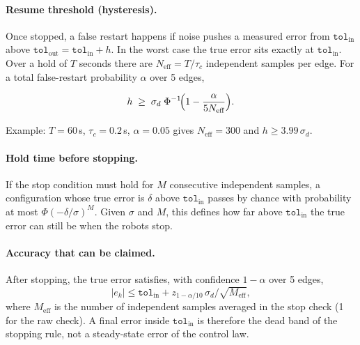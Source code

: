 \documentclass[11pt,a4paper]{article}
\begin{document}
\paragraph{Resume threshold (hysteresis).}
Once stopped, a false restart happens if noise pushes a measured error from
$\texttt{tol}_\text{in}$ above $\texttt{tol}_\text{out}=\texttt{tol}_\text{in}+h$.
In the worst case the true error sits exactly at $\texttt{tol}_\text{in}$.
Over a hold of $T$ seconds there are $N_\text{eff}=T/\tau_c$ independent samples
per edge. For a total false-restart probability $\alpha$ over 5 edges,
\begin{mathbox}
\begin{equation}
  h\;\ge\;\sigma_d\;\Phi^{-1}\!\Bigl(1-\frac{\alpha}{5N_\text{eff}}\Bigr).
  \label{eq:h}
\end{equation}
\end{mathbox}
Example: $T=60$\,s, $\tau_c=0.2$\,s, $\alpha=0.05$ gives $N_\text{eff}=300$
and $h\ge3.99\,\sigma_d$.

\paragraph{Hold time before stopping.}
If the stop condition must hold for $M$ consecutive independent samples,
a configuration whose true error is $\delta$ above $\texttt{tol}_\text{in}$
passes by chance with probability at most $\Phi(-\delta/\sigma)^M$. Given
$\sigma$ and $M$, this defines how far above $\texttt{tol}_\text{in}$ the true
error can still be when the robots stop.

\paragraph{Accuracy that can be claimed.}
After stopping, the true error satisfies, with confidence $1-\alpha$ over 5 edges,
\begin{equation}
  |e_k|\le\texttt{tol}_\text{in}+z_{1-\alpha/10}\,\sigma_d/\sqrt{M_\text{eff}},
\end{equation}
where $M_\text{eff}$ is the number of independent samples averaged in the
stop check (1 for the raw check). A final error inside
$\texttt{tol}_\text{in}$ is therefore the dead band of the stopping rule,
not a steady-state error of the control law.
\end{document}
